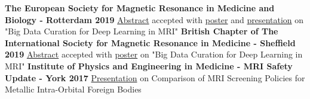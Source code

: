 %
%
%


\begin{scholarship}
					{\textbf{The European Society for Magnetic Resonance in Medicine and Biology - Rotterdam 2019} \newline
					{\color{linkcolor}\href{https://docs.google.com/document/d/1G7pH757oxIe1sHcdzDSAkMiXT1fwDc2vGO7_s7BtnXw/edit?usp=sharing}{Abstract}}
					 accepted with {\color{linkcolor}\href{https://esmrmb2019.smart-abstract.com/eposter/#/posters/205}{poster}}
					 and {\color{linkcolor}\href{https://docs.google.com/presentation/d/1Rxdmvw2FAuiOiUCHzFGIgZsua1LxavwbsUnkNdujhow/edit?usp=sharing}{presentation}}
					 on "Big Data Curation for Deep Learning in MRI"}
					{\textbf{British Chapter of The International Society for Magnetic Resonance in Medicine - Sheffield 2019} \newline
					{\color{linkcolor}\href{https://drive.google.com/file/d/11PLmamOCrgqiyeBzoPzvg3W4gWGqTmNs/view?usp=sharing}{Abstract}}
					 accepted with {\color{linkcolor}\href{https://drive.google.com/file/d/1F9Qs6NxkfJB5HB4zECSAqvP0_sb515x5/view?usp=sharing}{poster}}
					 on "Big Data Curation for Deep Learning in MRI"}
					{\textbf{Institute of Physics and Engineering in Medicine - MRI Safety Update - York 2017}\newline
					 {\color{linkcolor}\href{https://drive.google.com/file/d/1zuCNWtFlhXLoXzf3aVfL0WsRmb8uQkLn/view?usp=sharing}{Presentation}}
					 on Comparison of MRI Screening Policies for Metallic Intra-Orbital Foreign Bodies}
	\emptySeparator
\end{scholarship}